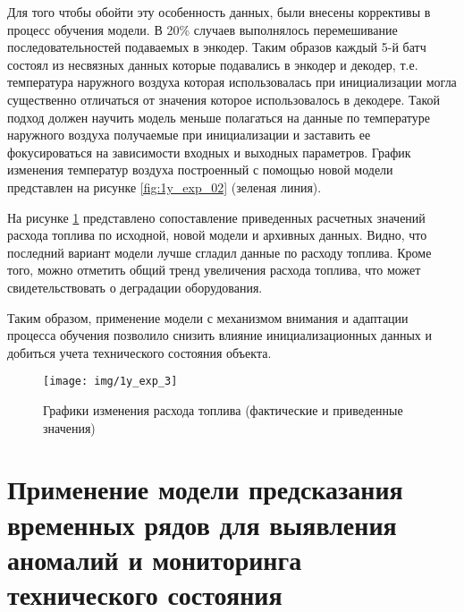 \documentclass[12pt,a4paper]{article}
\begin{document}

Для того чтобы обойти эту особенность данных, были внесены коррективы в процесс обучения модели. В 20\% случаев выполнялось перемешивание последовательностей подаваемых в энкодер. Таким образов каждый 5-й батч состоял из несвязных данных которые подавались в энкодер и декодер, т.е. температура наружного воздуха которая использовалась при инициализации могла существенно отличаться от значения которое использовалось в декодере. Такой подход должен научить модель меньше полагаться на данные по температуре наружного воздуха получаемые при инициализации и заставить ее фокусироваться на зависимости входных и выходных параметров. График изменения температур воздуха построенный с помощью новой модели представлен на рисунке \ref{fig:1y_exp_02} (зеленая линия).





На рисунке \ref{fig:1y_exp_3} представлено сопоставление приведенных расчетных значений расхода топлива по исходной, новой модели и архивных данных. Видно, что последний вариант модели лучше сгладил данные по расходу топлива. Кроме того, можно отметить общий тренд увеличения расхода топлива, что может свидетельствовать о деградации оборудования.

Таким образом, применение модели с механизмом внимания и адаптации процесса обучения позволило снизить влияние инициализационных данных и добиться учета технического состояния объекта.

\begin{figure}[htbp]
	\centering\texttt{[image: img/1y\_exp\_3]}
	\caption{Графики изменения расхода топлива (фактические и приведенные значения)}
	\label{fig:1y_exp_3}
\end{figure}

\newpage
\section{Применение модели предсказания временных рядов для выявления аномалий и мониторинга технического состояния}
\end{document}
